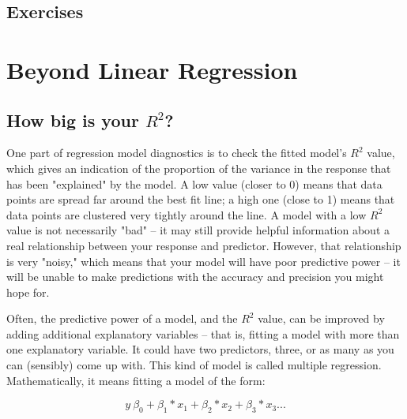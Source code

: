 \documentclass[twoside]{book}\usepackage[]{graphicx}\usepackage[]{xcolor}
\newif\ifsolutions
\newif\ifsolutionslocal
\begin{document}
\newpage
\section{Exercises}
\shipoutProblems


\ifsolutions
\ifsolutionslocal
\newpage
\section*{Solutions}
\shipoutSolutions
\fi
\fi









\setcounter{chapter}{7}
\chapter{Beyond Linear Regression}

\section{How big is your $R^2$?}
One part of regression model diagnostics is to check the fitted model's $R^2$ value, which gives an 
indication of the proportion of the variance in the response that has been "explained" by the model.  
A low value (closer to 0) means that data points are spread far around the best fit line; a high one 
(close to 1) means that data points are clustered very tightly around the line.  
A model with a low $R^2$ value is not necessarily "bad" -- it may still provide helpful information 
about a real relationship between your response and predictor. 
However, that relationship is very "noisy," which means that your model will have poor predictive power -- 
it will be unable to make predictions with the accuracy and precision you might hope for.

Often, the predictive power of a model, and the $R^2$ value, can be improved by adding additional 
explanatory variables -- that is, fitting a model with more than one explanatory variable. 
It could have two predictors, three, or as many as you can (sensibly) come up with. 
This kind of model is called multiple regression. Mathematically, it means fitting a model of the form:

$$ y ~ \beta_0 + \beta_1*x_1 + \beta_2*x_2 + \beta_3*x_3 ...$$
\end{document}
